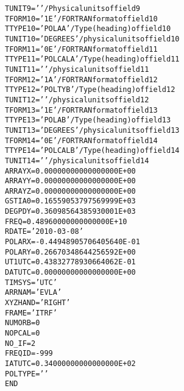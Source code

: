 \documentclass[twoside]{article}
\begin{document}
\begin{alltt}
TUNIT9  = '        '           / Physical units of field  9
TFORM10 = '1E      '           / FORTRAN format of field 10
TTYPE10 = 'POLAA           '   / Type (heading) of field 10
TUNIT10 = 'DEGREES '           / physical units of field 10
TFORM11 = '0E      '           / FORTRAN format of field 11
TTYPE11 = 'POLCALA         '   / Type (heading) of field 11
TUNIT11 = '        '           / physical units of field 11
TFORM12 = '1A      '           / FORTRAN format of field 12
TTYPE12 = 'POLTYB          '   / Type (heading) of field 12
TUNIT12 = '        '           / physical units of field 12
TFORM13 = '1E      '           / FORTRAN format of field 13
TTYPE13 = 'POLAB           '   / Type (heading) of field 13
TUNIT13 = 'DEGREES '           / physical units of field 13
TFORM14 = '0E      '           / FORTRAN format of field 14
TTYPE14 = 'POLCALB         '   / Type (heading) of field 14
TUNIT14 = '        '           / physical units of field 14
ARRAYX  =   0.00000000000000000E+00
ARRAYY  =   0.00000000000000000E+00
ARRAYZ  =   0.00000000000000000E+00
GSTIA0  =   0.16559053797569999E+03
DEGPDY  =   0.36098564385930001E+03
FREQ    =   0.48960000000000000E+10
RDATE   = '2010-03-08'
POLARX  =  -0.44948905706405640E-01
POLARY  =   0.26670348644256592E+00
UT1UTC  =   0.43832778930664062E-01
DATUTC  =   0.00000000000000000E+00
TIMSYS  = 'UTC     '
ARRNAM  = 'EVLA    '
XYZHAND = 'RIGHT   '
FRAME   = 'ITRF    '
NUMORB  =            0
NOPCAL  =            0
NO_IF   =            2
FREQID  =         -999
IATUTC  =   0.34000000000000000E+02
POLTYPE = '        '
END
\end{alltt}
\end{document}
